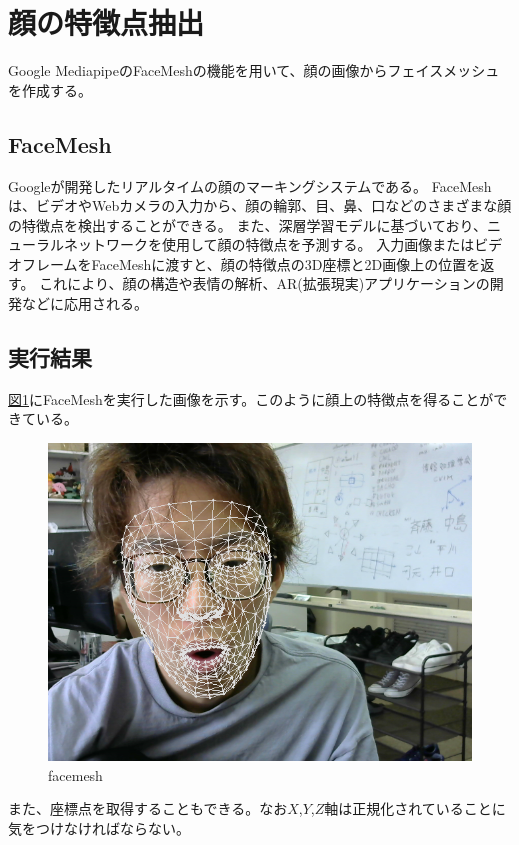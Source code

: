 \documentclass[]{jarticle}          %
\begin{document}
\section{顔の特徴点抽出}
Google MediapipeのFaceMeshの機能を用いて、顔の画像からフェイスメッシュを作成する。
\subsection{FaceMesh}
Googleが開発したリアルタイムの顔のマーキングシステムである。
FaceMeshは、ビデオやWebカメラの入力から、顔の輪郭、目、鼻、口などのさまざまな顔の特徴点を検出することができる。
また、深層学習モデルに基づいており、ニューラルネットワークを使用して顔の特徴点を予測する。
入力画像またはビデオフレームをFaceMeshに渡すと、顔の特徴点の3D座標と2D画像上の位置を返す。
これにより、顔の構造や表情の解析、AR(拡張現実)アプリケーションの開発などに応用される。

\subsection{実行結果}
\hyperref[five]{図\ref{five}}にFaceMeshを実行した画像を示す。このように顔上の特徴点を得ることができている。
\begin{figure}[!ht]
  \begin{center}
    \includegraphics[scale=0.35]{figures/facemesh.png}
    \caption{facemesh}
    \label{five}
  \end{center}
\end{figure}
また、座標点を取得することもできる。なお$X$,$Y$,$Z$軸は正規化されていることに気をつけなければならない。
\end{document}
